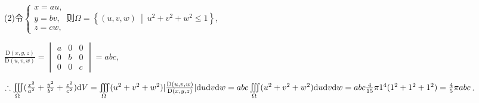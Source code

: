 \documentclass[12pt,UTF8]{ctexart}
\newcommand\Set[2]{\left\{#1\ \middle\vert\ #2 \right\}}
\newcommand{\IIInt}[3]{\iiint\limits_{#1}#2\mathrm d#3}
\newcommand{\varIIInt}[5]{\iiint\limits_{#1}#2\mathrm d#3\mathrm d#4\mathrm d#5}
\begin{document}
\begin{enumerate}
(2)令$\begin{cases}
x=au,\\
y=bv,\\
z=cw,
\end{cases}$则$\Omega=\Set{(u,v,w)}{u^2+v^2+w^2\leqslant1}$,

$\frac{\mathrm D(x,y,z)}{\mathrm D(u,v,w)}=\begin{vmatrix}
a&0&0\\
0&b&0\\
0&0&c
\end{vmatrix}=abc$,

$\therefore\IIInt\Omega{(\frac{x^2}{a^2}+\frac{y^2}{b^2}+\frac{z^2}{c^2})}V=\varIIInt\Omega{(u^2+v^2+w^2)|\frac{\mathrm D(u,v,w)}{\mathrm D(x,y,z)}|}uvw=abc\varIIInt\Omega{(u^2+v^2+w^2)}uvw\\
=abc\frac4{15}\pi 1^4(1^2+1^2+1^2)=\frac45\pi abc$.

\end{enumerate}
\end{document}
